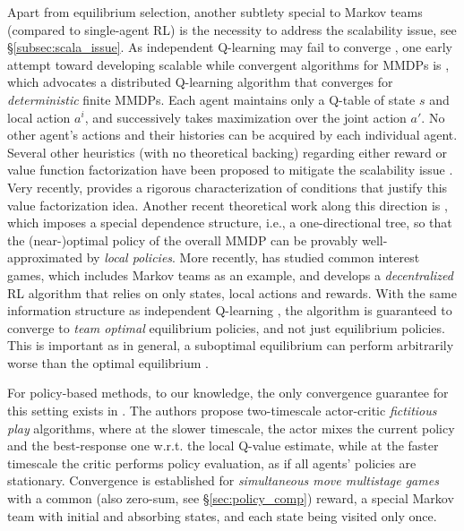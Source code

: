  
Apart from equilibrium selection, another subtlety   special to Markov teams (compared to single-agent RL) is the necessity to address the scalability issue, see  \S\ref{subsec:scala_issue}. As   independent Q-learning may fail to converge \cite{tan1993multi}, one early attempt toward developing  scalable while convergent algorithms for MMDPs is \cite{lauer2000algorithm}, which advocates a distributed Q-learning algorithm  that converges for \emph{deterministic} finite  MMDPs. Each agent maintains only a Q-table of state $s$ and local action $a^i$, and successively takes maximization over the joint action $a'$. No other agent's actions and their histories can be acquired by each individual agent. 
Several other heuristics (with no theoretical backing) regarding either reward or value function factorization  have been proposed to mitigate the scalability issue \cite{guestrin2002coordinated,guestrin2002multiagent,kok2004sparse,sunehag2018value,rashid2018qmix}.  Very recently,  \cite{pmlr-v97-son19a} provides a rigorous characterization of  conditions that justify  this value factorization idea. Another recent theoretical work  along this direction is \cite{qu2019exploiting},    which imposes a special dependence structure, i.e., a one-directional tree, so that the (near-)optimal policy of the overall MMDP can be provably well-approximated  by \emph{local policies}. 
More recently, 
\cite{yongacoglu2019learning}  has studied    common interest games, which  includes Markov teams as an example, and develops a \emph{decentralized} RL algorithm that relies on only states,  local   actions and rewards. With the same information structure as independent Q-learning \cite{tan1993multi}, the  algorithm is guaranteed to converge to \emph{team optimal} equilibrium policies, and not just equilibrium policies. This is important as in general, a suboptimal equilibrium can perform arbitrarily worse than
the optimal equilibrium  \cite{yongacoglu2019learning}. 



For 
policy-based methods,  
to  our knowledge, the only convergence guarantee  for this setting exists in  \cite{perolat2018actor}.  The authors propose two-timescale actor-critic \emph{fictitious play} algorithms, where at the slower timescale, the actor mixes the current policy and the best-response one w.r.t. the local Q-value estimate, while at the faster timescale the critic performs policy evaluation, as if all agents' policies are stationary. Convergence is established for  \emph{simultaneous move
multistage games} with a common (also zero-sum, see \S\ref{sec:policy_comp}) reward, a special Markov team  with initial and absorbing states, and each state being visited only once. 
   
